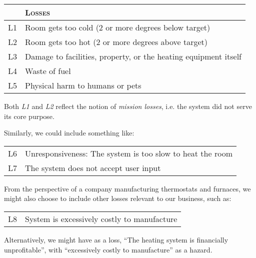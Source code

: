 %
\begin{tabular}{|p{.5cm}|p{8.5cm}|}
\hline
&\textsc{Losses}\\
\hline
L1 & Room gets too cold (2 or more degrees below target)\\
\hline
L2 & Room gets too hot (2 or more degrees above target)\\
\hline
L3 & Damage to facilities, property, or the heating equipment itself\\
\hline
L4 & Waste of fuel\\
\hline
L5 & Physical harm to humans or pets\\
\hline
\end{tabular}
\vspace{1em}

Both \emph{L1} and \emph{L2} reflect the notion of \emph{mission losses}, i.e. the system did not serve its core purpose. 

Similarly, we could include something like:

\begin{tabular}{ll}
L6&Unresponsiveness: The system is too slow to heat the room\\
L7&The system does not accept user input\\
\end{tabular}

From the perspective of a company manufacturing thermostats and furnaces, we might also choose to include other losses relevant to our business, such as:

\begin{tabular}{ll}
L8&System is excessively costly to manufacture\\
\end{tabular}

Alternatively, we might have as a loss, ``The heating system is financially unprofitable'', with ``excessively costly to manufacture'' as a hazard.
